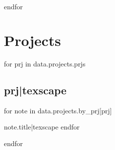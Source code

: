 \documentclass[
  10pt,
  a4paper,
  twocolumn,
  portrait,
]{article}
\newcommand{\VAR}[1]{#1}
\newcommand{\BLOCK}[1]{#1}
\begin{document}
\BLOCK{endfor}
\clearpage
\section*{Projects}
\BLOCK{for prj in data.projects.prjs}
\subsection*{\VAR{prj|texscape}}
\begin{todolist}
\BLOCK{for note in data.projects.by_prj[prj]}
  \item {\VAR{note.title|texscape}}
\BLOCK{endfor}
\end{todolist}
\BLOCK{endfor}
\end{document}
